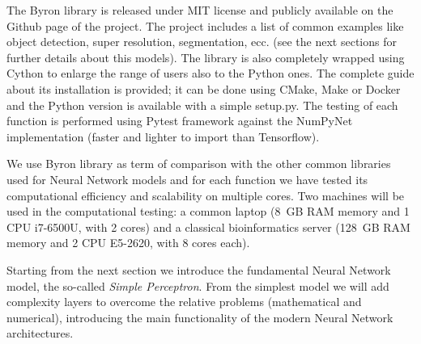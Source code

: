\documentclass{standalone}
\begin{document}
The \textsf{Byron} library is released under \textsf{MIT} license and publicly available on the \textsf{Github} page of the project.
The project includes a list of common examples like object detection, super resolution, segmentation, ecc. (see the next sections for further details about this models).
The library is also completely wrapped using \textsf{Cython} to enlarge the range of users also to the \textsf{Python} ones.
The complete guide about its installation is provided; it can be done using \textsf{CMake}, \textsf{Make} or \textsf{Docker} and the \textsf{Python} version is available with a simple \textsf{setup.py}.
The testing of each function is performed using \textsf{Pytest} framework against the \textsf{NumPyNet} implementation (faster and lighter to import than \textsf{Tensorflow}).

We use \textsf{Byron} library as term of comparison with the other common libraries used for Neural Network models and for each function we have tested its computational efficiency and scalability on multiple cores.
Two machines will be used in the computational testing: a common laptop (8~GB RAM memory and 1 CPU i7-6500U, with 2 cores) and a classical bioinformatics server (128~GB RAM memory and 2 CPU E5-2620, with 8 cores each).

Starting from the next section we introduce the fundamental Neural Network model, the so-called \emph{Simple Perceptron}.
From the simplest model we will add complexity layers to overcome the relative problems (mathematical and numerical), introducing the main functionality of the modern Neural Network architectures.
\end{document}
